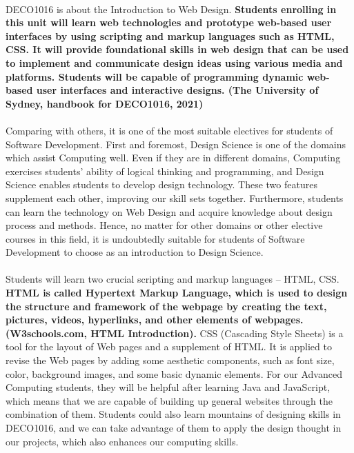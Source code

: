 \documentclass{article}
\begin{document}
	\\
	DECO1016 is about the Introduction to Web Design. \textbf{Students enrolling in this unit will learn web technologies and prototype web-based user interfaces by using scripting and markup languages such as HTML, CSS. It will provide foundational skills in web design that can be used to implement and communicate design ideas using various media and platforms. Students will be capable of programming dynamic web-based user interfaces and interactive designs. (The University of Sydney, handbook for DECO1016, 2021)}\\
	\\
	Comparing with others, it is one of the most suitable electives for students of Software Development. First and foremost, Design Science is one of the domains which assist Computing well. Even if they are in different domains, Computing exercises students' ability of logical thinking and programming, and Design Science enables students to develop design technology. These two features supplement each other, improving our skill sets together. Furthermore, students can learn the technology on Web Design and acquire knowledge about design process and methods. Hence, no matter for other domains or other elective courses in this field, it is undoubtedly suitable for students of Software Development to choose as an introduction to Design Science.\\
	\\
	Students will learn two crucial scripting and markup languages -- HTML, CSS. \textbf{HTML is called Hypertext Markup Language, which is used to design the structure and framework of the webpage by creating the text, pictures, videos, hyperlinks, and other elements of webpages. (W3schools.com, HTML Introduction).} CSS (Cascading Style Sheets) is a tool for the layout of Web pages and a supplement of HTML. It is applied to revise the Web pages by adding some aesthetic components, such as font size, color, background images, and some basic dynamic elements. For our Advanced Computing students, they will be helpful after learning Java and JavaScript, which means that we are capable of building up general websites through the combination of them. Students could also learn mountains of designing skills in DECO1016, and we can take advantage of them to apply the design thought in our projects, which also enhances our computing skills. \\
	\\
\end{document}
